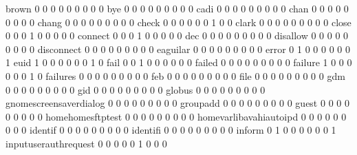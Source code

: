 \documentclass[compress,8pt]{beamer}
\begin{document}
\begin{frame}
\begin{Schunk}
  brown                                      0   0   0   0   0   0   0   0   0
  bye                                        0   0   0   0   0   0   0   0   0
  cadi                                       0   0   0   0   0   0   0   0   0
  chan                                       0   0   0   0   0   0   0   0   0
  chang                                      0   0   0   0   0   0   0   0   0
  check                                      0   0   0   0   0   0   1   0   0
  clark                                      0   0   0   0   0   0   0   0   0
  close                                      0   0   0   1   0   0   0   0   0
  connect                                    0   0   0   1   0   0   0   0   0
  dec                                        0   0   0   0   0   0   0   0   0
  disallow                                   0   0   0   0   0   0   0   0   0
  disconnect                                 0   0   0   0   0   0   0   0   0
  eaguilar                                   0   0   0   0   0   0   0   0   0
  error                                      0   1   0   0   0   0   0   0   1
  euid                                       1   0   0   0   0   0   0   1   0
  fail                                       0   0   1   0   0   0   0   0   0
  failed                                     0   0   0   0   0   0   0   0   0
  failure                                    1   0   0   0   0   0   0   1   0
  failures                                   0   0   0   0   0   0   0   0   0
  feb                                        0   0   0   0   0   0   0   0   0
  file                                       0   0   0   0   0   0   0   0   0
  gdm                                        0   0   0   0   0   0   0   0   0
  gid                                        0   0   0   0   0   0   0   0   0
  globus                                     0   0   0   0   0   0   0   0   0
  gnomescreensaverdialog                     0   0   0   0   0   0   0   0   0
  groupadd                                   0   0   0   0   0   0   0   0   0
  guest                                      0   0   0   0   0   0   0   0   0
  homehomesftptest                           0   0   0   0   0   0   0   0   0
  homevarlibavahiautoipd                     0   0   0   0   0   0   0   0   0
  identif                                    0   0   0   0   0   0   0   0   0
  identifi                                   0   0   0   0   0   0   0   0   0
  inform                                     0   1   0   0   0   0   0   0   1
  inputuserauthrequest                       0   0   0   0   0   1   0   0   0

\end{Schunk}
\end{frame}
\end{document}
